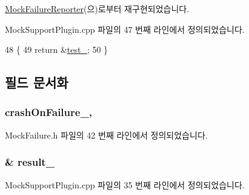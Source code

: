 \hyperlink{class_mock_failure_reporter_ae3f75fac53b4d3395e02ee8eca858422}{Mock\+Failure\+Reporter}(으)로부터 재구현되었습니다.



Mock\+Support\+Plugin.\+cpp 파일의 47 번째 라인에서 정의되었습니다.


\begin{DoxyCode}
48     \{
49         \textcolor{keywordflow}{return} &\hyperlink{class_mock_support_plugin_reporter_a04705de644c9d275d37d01675cd54a9c}{test\_};
50     \}
\end{DoxyCode}


\subsection{필드 문서화}
\subsubsection[{\texorpdfstring{crash\+On\+Failure\+\_\+}{crashOnFailure_}}]{ crash\+On\+Failure\+\_\+\hspace{0.3cm}{\ttfamily [protected]}, {\ttfamily [inherited]}}\hypertarget{class_mock_failure_reporter_a9faf961cbe6687577f4eaae4625bcbea}{}\label{class_mock_failure_reporter_a9faf961cbe6687577f4eaae4625bcbea}


Mock\+Failure.\+h 파일의 42 번째 라인에서 정의되었습니다.

\subsubsection[{\texorpdfstring{result\+\_\+}{result_}}]{\& result\+\_\+\hspace{0.3cm}{\ttfamily [private]}}\hypertarget{class_mock_support_plugin_reporter_a352fd6260eac45bae95c706d39923c2e}{}\label{class_mock_support_plugin_reporter_a352fd6260eac45bae95c706d39923c2e}


Mock\+Support\+Plugin.\+cpp 파일의 35 번째 라인에서 정의되었습니다.

